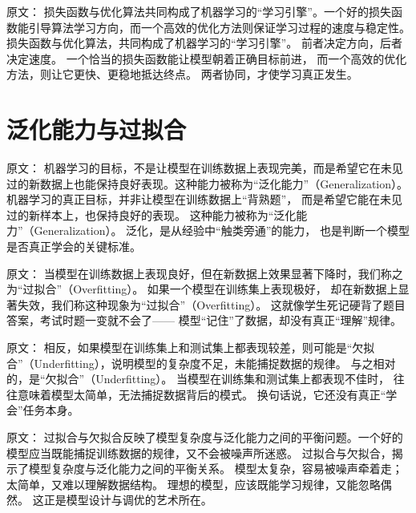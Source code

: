 原文：
损失函数与优化算法共同构成了机器学习的“学习引擎”。一个好的损失函数能引导算法学习方向，而一个高效的优化方法则保证学习过程的速度与稳定性。
损失函数与优化算法，共同构成了机器学习的“学习引擎”。  
前者决定方向，后者决定速度。  
一个恰当的损失函数能让模型朝着正确目标前进，  
而一个高效的优化方法，则让它更快、更稳地抵达终点。  
两者协同，才使学习真正发生。

\section{泛化能力与过拟合}

原文：
机器学习的目标，不是让模型在训练数据上表现完美，而是希望它在未见过的新数据上也能保持良好表现。这种能力被称为“泛化能力”（Generalization）。
机器学习的真正目标，并非让模型在训练数据上“背熟题”，  
而是希望它能在未见过的新样本上，也保持良好的表现。  
这种能力被称为“泛化能力”（Generalization）。  
泛化，是从经验中“触类旁通”的能力，  
也是判断一个模型是否真正学会的关键标准。



原文：
当模型在训练数据上表现良好，但在新数据上效果显著下降时，我们称之为“过拟合”（Overfitting）。
如果一个模型在训练集上表现极好，  
却在新数据上显著失效，我们称这种现象为“过拟合”（Overfitting）。  
这就像学生死记硬背了题目答案，考试时题一变就不会了——  
模型“记住”了数据，却没有真正“理解”规律。



原文：
相反，如果模型在训练集上和测试集上都表现较差，则可能是“欠拟合”（Underfitting），说明模型的复杂度不足，未能捕捉数据的规律。
与之相对的，是“欠拟合”（Underfitting）。  
当模型在训练集和测试集上都表现不佳时，  
往往意味着模型太简单，无法捕捉数据背后的模式。  
换句话说，它还没有真正“学会”任务本身。



原文：
过拟合与欠拟合反映了模型复杂度与泛化能力之间的平衡问题。一个好的模型应当既能捕捉训练数据的规律，又不会被噪声所迷惑。
过拟合与欠拟合，揭示了模型复杂度与泛化能力之间的平衡关系。  
模型太复杂，容易被噪声牵着走；太简单，又难以理解数据结构。  
理想的模型，应该既能学习规律，又能忽略偶然。  
这正是模型设计与调优的艺术所在。

